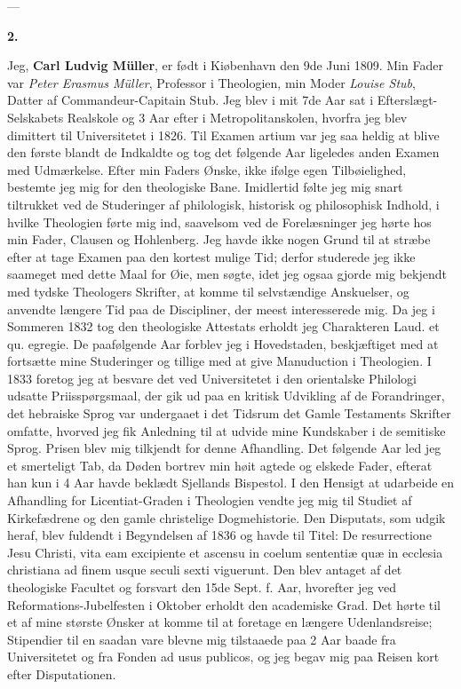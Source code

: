 \documentclass[12pt,a4paper]{article}
\newcommand{\opage}[1]{\marginnote{\footnotesize\textit{[#1]}}}
\begin{document}
\begin{center}---\end{center}

\begin{center}\textbf{2.}\end{center}

Jeg, \textbf{Carl Ludvig Müller}, er født i Kiøbenhavn den 9de Juni 1809. Min
Fader var \emph{Peter Erasmus Müller}, Professor i Theologien, min Moder
\emph{Louise Stub}, Datter af Commandeur-Capitain Stub. Jeg blev i mit 7de Aar
sat i Efterslægt-Selskabets Realskole og 3 Aar efter i Metropolitanskolen,
hvorfra jeg blev dimittert til Universitetet i 1826. Til Examen artium var jeg saa
heldig at blive den første blandt de Indkaldte og tog det følgende Aar ligeledes
anden Examen med Udmærkelse. Efter min Faders Ønske, ikke ifølge egen
Tilbøielighed, bestemte jeg mig for den theologiske Bane. Imidlertid følte jeg mig
snart tiltrukket ved de Studeringer af philologisk, historisk og philosophisk
Indhold, i hvilke Theologien førte mig ind, saavelsom ved de Forelæsninger jeg
hørte hos min Fader, Clausen og Hohlenberg. Jeg havde ikke nogen Grund til at
stræbe efter at tage Examen paa den kortest mulige Tid; derfor studerede jeg ikke
saameget
\opage{41} med dette Maal for Øie, men søgte, idet jeg ogsaa gjorde mig bekjendt med tydske
Theologers Skrifter, at komme til selvstændige Anskuelser, og anvendte længere
Tid paa de Discipliner, der meest interesserede mig. Da jeg i Sommeren 1832 tog
den theologiske Attestats erholdt jeg Charakteren Laud. et qu. egregie. De
paafølgende Aar forblev jeg i Hovedstaden, beskjæftiget med at fortsætte mine
Studeringer og tillige med at give Manuduction i Theologien. I 1833 foretog jeg
at besvare det ved Universitetet i den orientalske Philologi udsatte
Priisspørgsmaal, der gik ud paa en kritisk Udvikling af de Forandringer, det
hebraiske Sprog var undergaaet i det Tidsrum det Gamle Testaments Skrifter
omfatte, hvorved jeg fik Anledning til at udvide mine Kundskaber i de semitiske
Sprog. Prisen blev mig tilkjendt for denne Afhandling. Det følgende Aar led jeg
et smerteligt Tab, da Døden bortrev min høit agtede og elskede Fader, efterat han
kun i 4 Aar havde beklædt Sjellands Bispestol. I den Hensigt at udarbeide en
Afhandling for Licentiat-Graden i Theologien vendte jeg mig til Studiet af
Kirkefædrene og den gamle christelige Dogmehistorie. Den Disputats, som udgik
heraf, blev fuldendt i Begyndelsen af 1836 og havde til Titel: De resurrectione
Jesu Christi, vita eam excipiente et ascensu in coelum sententiæ quæ in ecclesia
christiana ad finem usque seculi sexti viguerunt. Den blev antaget af det
theologiske Facultet og forsvart den 15de Sept. f. Aar, hvorefter jeg ved
Reformations-Jubelfesten i Oktober erholdt den academiske Grad. Det hørte til et
af mine største Ønsker at komme til at foretage en længere Udenlandsreise;
Stipendier til en saadan vare blevne mig tilstaaede paa 2 Aar baade fra
Universitetet og fra Fonden ad usus publicos, og jeg begav mig paa Reisen kort
efter Disputationen.
\end{document}
